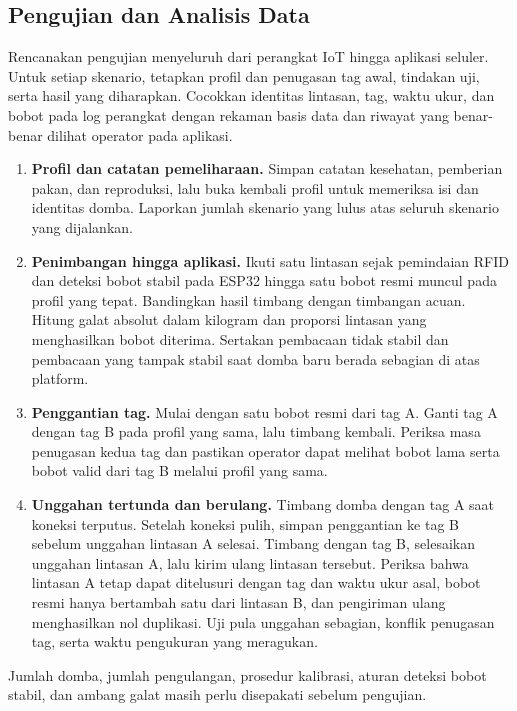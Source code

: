 \documentclass[12pt,a4paper]{report}
\begin{document}
\subsection{Pengujian dan Analisis Data}
Rencanakan pengujian menyeluruh dari perangkat IoT hingga aplikasi seluler.
Untuk setiap skenario, tetapkan profil dan penugasan tag awal, tindakan uji,
serta hasil yang diharapkan. Cocokkan identitas lintasan, tag, waktu ukur,
dan bobot pada log perangkat dengan rekaman basis data dan riwayat yang
benar-benar dilihat operator pada aplikasi.
\begin{enumerate}
\item \textbf{Profil dan catatan pemeliharaan.} Simpan catatan kesehatan,
pemberian pakan, dan reproduksi, lalu buka kembali profil untuk memeriksa
isi dan identitas domba. Laporkan jumlah skenario yang lulus atas seluruh
skenario yang dijalankan.
\item \textbf{Penimbangan hingga aplikasi.} Ikuti satu lintasan sejak
pemindaian RFID dan deteksi bobot stabil pada ESP32 hingga satu bobot resmi
muncul pada profil yang tepat. Bandingkan hasil timbang dengan timbangan
acuan. Hitung galat absolut dalam kilogram dan proporsi lintasan yang
menghasilkan bobot diterima. Sertakan pembacaan tidak stabil dan pembacaan
yang tampak stabil saat domba baru berada sebagian di atas platform.
\item \textbf{Penggantian tag.} Mulai dengan satu bobot resmi dari tag A.
Ganti tag A dengan tag B pada profil yang sama, lalu timbang kembali.
Periksa masa penugasan kedua tag dan pastikan operator dapat melihat bobot
lama serta bobot valid dari tag B melalui profil yang sama.
\item \textbf{Unggahan tertunda dan berulang.} Timbang domba dengan tag A
saat koneksi terputus. Setelah koneksi pulih, simpan penggantian ke tag B
sebelum unggahan lintasan A selesai. Timbang dengan tag B, selesaikan
unggahan lintasan A, lalu kirim ulang lintasan tersebut. Periksa bahwa
lintasan A tetap dapat ditelusuri dengan tag dan waktu ukur asal, bobot
resmi hanya bertambah satu dari lintasan B, dan pengiriman ulang menghasilkan
nol duplikasi. Uji pula unggahan sebagian, konflik penugasan tag, serta
waktu pengukuran yang meragukan.
\end{enumerate}
Jumlah domba, jumlah pengulangan, prosedur kalibrasi, aturan deteksi bobot
stabil, dan ambang galat masih perlu disepakati sebelum pengujian.
\end{document}
